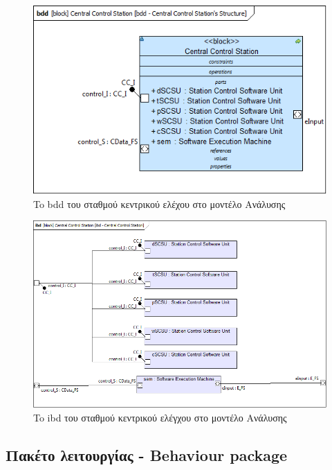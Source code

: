 \documentclass[a4paper,12pt,twoside]{report}
\begin{document}
\begin{appendices}
			\begin{figure}[hp]
					\centering
					\includegraphics[scale=0.50]{AnalysisModel_bdd-CentralControlStationsStructure.png}
					\caption{To bdd του σταθμού κεντρικού ελέχου στο μοντέλο Ανάλυσης}
					\label{φωτ:To bdd του σταθμού κεντρικού ελέγχου στο μοντέλο Ανάλυσης}
			\end{figure}
			
			\begin{figure}[hp]
					\centering
					\includegraphics[scale=0.50]{AnalysisModel_ibd-CentralControlStation.png}
					\caption{To ibd του σταθμού κεντρικού ελέγχου στο μοντέλο Ανάλυσης}
					\label{φωτ:To ibd του σταθμού κεντρικού ελέγχου στο μοντέλο Ανάλυσης}
			\end{figure}

			\FloatBarrier
			\subsection{Πακέτο λειτουργίας - Behaviour package}


\end{appendices}
\end{document}
